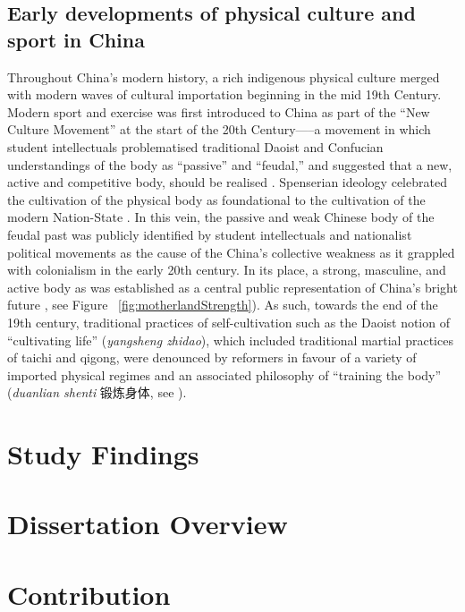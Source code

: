 \subsection{Early developments of physical culture and sport in China}
Throughout China's modern history, a rich indigenous physical culture merged with modern waves of cultural importation beginning in the mid 19th Century. Modern sport and exercise was first introduced to China as part of the ``New Culture Movement'' at the start of the 20th Century—--a movement in which student intellectuals problematised traditional Daoist and Confucian understandings of the body as ``passive'' and ``feudal,'' and suggested that a new, active and competitive body, should be realised \citep{Ge2005}.  Spenserian ideology celebrated the cultivation of the physical body as foundational to the cultivation of the modern Nation-State \citep{Morris2004}. In this vein, the passive and weak Chinese body of the feudal past was publicly identified by student intellectuals and nationalist political movements as the cause of the China's collective weakness as it grappled with colonialism in the early 20th century.
In its place, a strong, masculine, and active body as was established as a central public representation of China's bright future \citep{Brownell1995}, see Figure ~\ref{fig:motherlandStrength}).  As such, towards the end of the 19th century, traditional practices of self-cultivation such as the Daoist notion of ``cultivating life'' (\textit{yangsheng zhidao}), which included traditional martial practices of taichi and qigong, were denounced by reformers in favour of a variety of imported physical regimes and an associated philosophy of ``training the body'' (\textit{duanlian shenti} 锻炼身体, see \cite{Farquhar2012}).

\section{Study Findings}

\section{Dissertation Overview}

\section{Contribution}
